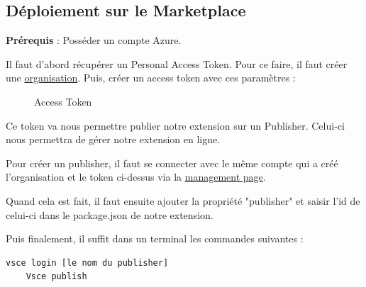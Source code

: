 \documentclass[
    iict, %
    il, %
]{heig-tb}
\begin{document}
\subsection{Déploiement sur le Marketplace}

\textbf{Prérequis} : Posséder un compte Azure.

Il faut d'abord récupérer un Personal Access Token. Pour ce faire, il faut créer une \href{https://docs.microsoft.com/en-us/azure/devops/organizations/accounts/create-organization?view=azure-devops}{organisation}.
Puis, créer un access token avec ces paramètres :
\begin{figure}[!h]
    \begin{center}
    \end{center}
    \caption[Access Token]{\label{access-token}Access Token}
\end{figure}

Ce token va nous permettre publier notre extension sur un Publisher. Celui-ci nous permettra de gérer notre extension en ligne.

Pour créer un publisher, il faut se connecter avec le même compte qui a créé l'organisation et le token ci-dessus via la \href{https://marketplace.visualstudio.com/manage/publishers/}{management page}.

Quand cela est fait, il faut ensuite ajouter la propriété "publisher" et saisir l'id de celui-ci dans le package.json de notre extension.

Puis finalement, il suffit dans un terminal les commandes suivantes :
\begin{lstlisting}[frame=single]
    vsce login [le nom du publisher]
    Vsce publish
\end{lstlisting}
\end{document}
